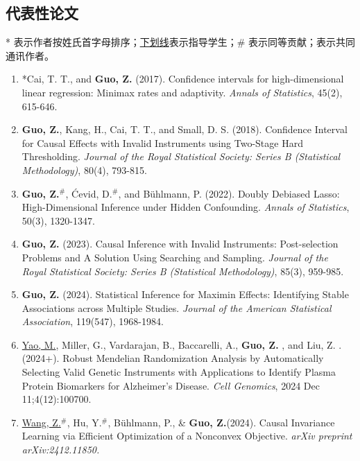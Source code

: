\documentclass[margin, line]{res}
\begin{document}
\begin{resume}
		\section{\sc 代表性论文}
		* 表示作者按姓氏首字母排序；\underline{下划线}表示指导学生；$\#$ 表示同等贡献；\Envelope 表示共同通讯作者。

		\begin{enumerate}
			\setlength{\itemsep}{3pt}

			\item[(R1)] {*}Cai, T. T., and {\bf Guo, Z.} (2017). Confidence intervals for
				high-dimensional linear regression: Minimax rates and adaptivity. {\it Annals of Statistics},
				45(2), 615-646.

			\item[(R2)] {\bf Guo, Z.}, Kang, H., Cai, T. T., and Small, D. S. (2018). Confidence
				Interval for Causal Effects with Invalid Instruments using Two-Stage Hard
				Thresholding.
				{\it Journal of the Royal Statistical Society: Series B (Statistical Methodology)},
				80(4), 793-815.

			\item[(R3)] {\bf Guo, Z.}$^{\#}$, \'{C}evid, D.$^{\#}$, and B\"{u}hlmann, P.
				(2022). Doubly Debiased Lasso: High-Dimensional Inference under Hidden
				Confounding. {\it Annals of Statistics}, 50(3), 1320-1347.

			\item[(R4)] {\bf Guo, Z.} (2023). Causal Inference with Invalid
				Instruments: Post-selection Problems and A Solution Using Searching and Sampling.
				{\it Journal of the Royal Statistical Society: Series B (Statistical Methodology)},
				85(3), 959-985.

			\item[(R5)] {\bf Guo, Z.} (2024). Statistical Inference for Maximin
				Effects: Identifying Stable Associations across Multiple Studies.
				{\it Journal of the American Statistical Association}, 119(547), 1968-1984.

			\item[(R6)] \underline{Yao, M.}, Miller, G., Vardarajan, B., Baccarelli, A.,
				{\bf Guo, Z.} \Envelope, and Liu, Z. \Envelope. (2024+). Robust
				Mendelian Randomization Analysis by Automatically Selecting Valid
				Genetic Instruments with Applications to Identify Plasma Protein
				Biomarkers for Alzheimer{\textquoteright}s Disease. {\it Cell Genomics},
				2024 Dec 11;4(12):100700.

			\item[(R7)] \underline{Wang, Z.}$^{\#}$, Hu, Y.$^{\#}$, Bühlmann, P.\Envelope,
				\& {\bf Guo, Z.}\Envelope (2024). Causal Invariance Learning via
				Efficient Optimization of a Nonconvex Objective. {\it arXiv preprint arXiv:2412.11850.}


\end{enumerate}
\end{resume}
\end{document}
